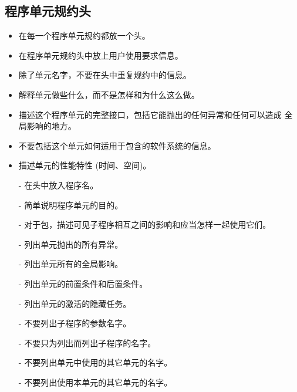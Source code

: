 \subsection{程序单元规约头}

\begin{itemize}
    \item 在每一个程序单元规约都放一个头。
    \item 在程序单元规约头中放上用户使用要求信息。
    \item 除了单元名字，不要在头中重复规约中的信息。
    \item 解释单元做些什么，而不是怎样和为什么这么做。
    \item 描述这个程序单元的完整接口，包括它能抛出的任何异常和任何可以造成
全局影响的地方。
    \item 不要包括这个单元如何适用于包含的软件系统的信息。
    \item 描述单元的性能特性 (时间、空间)。
\end{itemize}

\begin{itemize}
    \item[-] 在头中放入程序名。
    \item[-] 简单说明程序单元的目的。
    \item[-] 对于包，描述可见子程序相互之间的影响和应当怎样一起使用它们。
    \item[-] 列出单元抛出的所有异常。
    \item[-] 列出单元所有的全局影响。
    \item[-] 列出单元的前置条件和后置条件。
    \item[-] 列出单元的激活的隐藏任务。
    \item[-] 不要列出子程序的参数名字。
    \item[-] 不要只为列出而列出子程序的名字。
    \item[-] 不要列出单元中使用的其它单元的名字。
    \item[-] 不要列出使用本单元的其它单元的名字。
\end{itemize}

